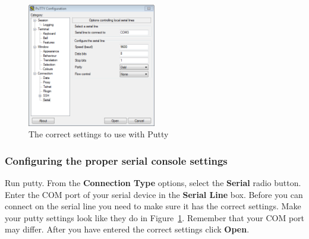 \documentclass[notitlepage]{article}
\begin{document}
\begin{figure}[ht!]
  \centering
  \includegraphics[width=0.5\textwidth]{fig0.png}
  \caption{The correct settings to use with Putty}
  \label{fig:putty}
\end{figure}

\subsubsection{Configuring the proper serial console settings}
  Run putty. From the \textbf{Connection Type} options, select the \textbf{Serial} radio button. Enter the COM port of your serial device in the \textbf{Serial Line} box. Before you can connect on the serial line you need to make sure it has the correct settings. Make your putty settings look like they do in Figure~\ref{fig:putty}. Remember that your COM port may differ. After you have entered the correct settings click \textbf{Open}.
\end{document}
